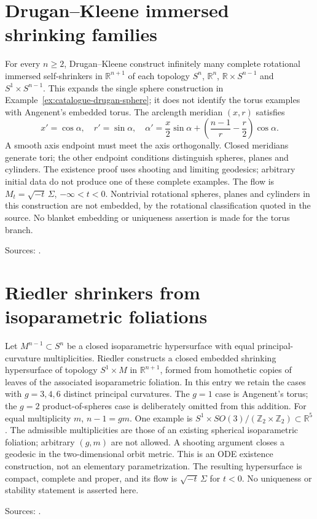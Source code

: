 \chapter{Drugan--Kleene immersed shrinking families}\label{sec:catalogue-drugan-kleene}
\begin{example}\label{ex:catalogue-drugan-kleene}
For every $n\geq2$, Drugan--Kleene construct infinitely many complete rotational immersed self-shrinkers in $\mathbb R^{n+1}$ of each topology $S^n$, $\mathbb R^n$, $\mathbb R\times S^{n-1}$ and $S^1\times S^{n-1}$. This expands the single sphere construction in Example~\ref{ex:catalogue-drugan-sphere}; it does not identify the torus examples with Angenent's embedded torus.
The arclength meridian $(x,r)$ satisfies
\[
 x'=\cos\alpha,\quad r'=\sin\alpha,\quad
 \alpha'=\frac{x}{2}\sin\alpha+\left(\frac{n-1}{r}-\frac r2\right)\cos\alpha.
\]
A smooth axis endpoint must meet the axis orthogonally. Closed meridians generate tori; the other endpoint conditions distinguish spheres, planes and cylinders. The existence proof uses shooting and limiting geodesics; arbitrary initial data do not produce one of these complete examples. The flow is $M_t=\sqrt{-t}\,\Sigma$, $-\infty<t<0$. Nontrivial rotational spheres, planes and cylinders in this construction are not embedded, by the rotational classification quoted in the source. No blanket embedding or uniqueness assertion is made for the torus branch.
\par Sources: \cite{CatDruganKleene2017}.
\end{example}

\chapter{Riedler shrinkers from isoparametric foliations}\label{sec:catalogue-riedler-isoparametric}
\begin{example}\label{ex:catalogue-riedler-isoparametric}
Let $M^{n-1}\subset S^n$ be a closed isoparametric hypersurface with equal principal-curvature multiplicities. Riedler constructs a closed embedded shrinking hypersurface of topology $S^1\times M$ in $\mathbb R^{n+1}$, formed from homothetic copies of leaves of the associated isoparametric foliation. In this entry we retain the cases with $g=3,4,6$ distinct principal curvatures. The $g=1$ case is Angenent's torus; the $g=2$ product-of-spheres case is deliberately omitted from this addition.
For equal multiplicity $m$, $n-1=gm$. One example is $S^1\times SO(3)/(\mathbb Z_2\times\mathbb Z_2)\subset\mathbb R^5$. The admissible multiplicities are those of an existing spherical isoparametric foliation; arbitrary $(g,m)$ are not allowed. A shooting argument closes a geodesic in the two-dimensional orbit metric. This is an ODE existence construction, not an elementary parametrization. The resulting hypersurface is compact, complete and proper, and its flow is $\sqrt{-t}\,\Sigma$ for $t<0$. No uniqueness or stability statement is asserted here.
\par Sources: \cite{CatRiedler2023}.
\end{example}

